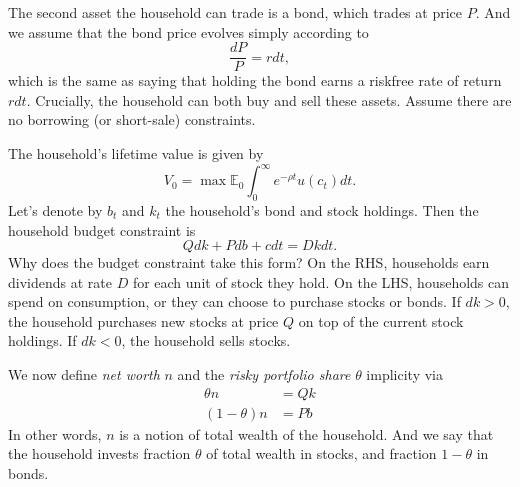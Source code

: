 \documentclass[11pt]{extarticle}
\theoremstyle{plain}
\theoremstyle{definition}
\begin{document}
The second asset the household can trade is a bond, which trades at price $P$. And we assume that the bond price evolves simply according to 
\begin{equation*}
	\frac{dP}{P} = r dt,
\end{equation*}
which is the same as saying that holding the bond earns a riskfree rate of return $r dt$. Crucially, the household can both buy and sell these assets. Assume there are no borrowing (or short-sale) constraints. 

The household's lifetime value is given by
\begin{equation*}
	V_0 = \max \mathbb E_0 \int_0^\infty e^{- \rho t} u(c_t) dt.
\end{equation*}
Let's denote by $b_t$ and $k_t$ the household's bond and stock holdings. Then the household budget constraint is 
\begin{equation*}
	Q dk + P db + c dt = D k dt. 
\end{equation*}
Why does the budget constraint take this form? On the RHS, households earn dividends at rate $D$ for each unit of stock they hold. On the LHS, households can spend on consumption, or they can choose to purchase stocks or bonds. If $dk > 0$, the household purchases new stocks at price $Q$ on top of the current stock holdings. If $dk < 0$, the household sells stocks. 


We now define \textit{net worth} $n$ and the \textit{risky portfolio share} $\theta$ implicity via 
\begin{align*}
	\theta n &= Q k \\
	(1-\theta) n &= Pb
\end{align*}
In other words, $n$ is a notion of total wealth of the household. And we say that the household invests fraction $\theta$ of total wealth in stocks, and fraction $1-\theta$ in bonds.  
\end{document}
